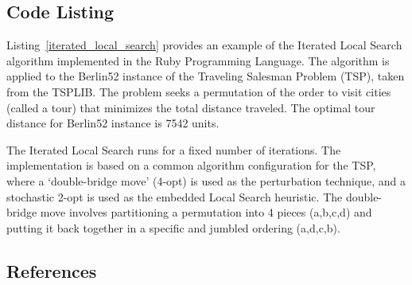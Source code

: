 \subsection{Code Listing}
Listing~\ref{iterated_local_search} provides an example of the Iterated Local Search algorithm implemented in the Ruby Programming Language. 
The algorithm is applied to the Berlin52 instance of the Traveling Salesman Problem (TSP), taken from the TSPLIB. The problem seeks a permutation of the order to visit cities (called a tour) that minimizes the total distance traveled. The optimal tour distance for Berlin52 instance is 7542 units.

The Iterated Local Search runs for a fixed number of iterations. The implementation is based on a common algorithm configuration for the TSP, where a `double-bridge move' (4-opt) is used as the perturbation technique, and a stochastic 2-opt is used as the embedded Local Search heuristic.
The double-bridge move involves partitioning a permutation into 4 pieces (a,b,c,d) and putting it back together in a specific and jumbled ordering (a,d,c,b).



\subsection{References}

% 
% 
